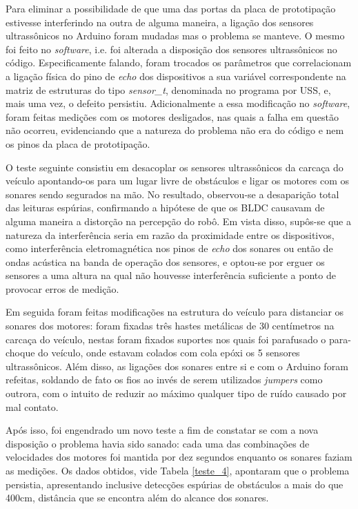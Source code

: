 Para eliminar a possibilidade de que uma das portas da placa de prototipação estivesse interferindo na outra de alguma maneira, a 
ligação dos sensores ultrassônicos no Arduino foram mudadas mas o problema se manteve.
O mesmo foi feito no \textit{software}, i.e. foi alterada a disposição dos sensores ultrassônicos no código. 
Especificamente falando, foram trocados os parâmetros que correlacionam a ligação física do pino de \textit{echo} dos dispositivos a sua variável 
correspondente na matriz de estruturas do tipo \textit{sensor\_t}, denominada no programa por USS, e, mais uma vez, o defeito persistiu.
Adicionalmente a essa modificação no \textit{software}, foram feitas medições com os motores desligados, nas quais a falha em questão não ocorreu, 
evidenciando que a natureza do problema não era do código e nem os pinos da placa de prototipação.

O teste seguinte consistiu em desacoplar os sensores ultrassônicos da carcaça do veículo apontando-os para um lugar livre de obstáculos e ligar os 
motores com os sonares sendo segurados na mão. 
No resultado, observou-se a desaparição total das leituras espúrias, confirmando a hipótese de que os BLDC causavam de alguma maneira a distorção na 
percepção do robô.
Em vista disso, supôs-se que a natureza da interferência seria em razão da proximidade entre os dispositivos, como interferência eletromagnética nos 
pinos de \textit{echo} dos sonares ou então de ondas acústica na banda de operação dos sensores, e optou-se por erguer os sensores a uma altura 
na qual não houvesse interferência suficiente a ponto de provocar erros de medição.

Em seguida foram feitas modificações na estrutura do veículo para distanciar os sonares dos motores: foram fixadas três hastes metálicas de 30 
centímetros na carcaça do veículo, nestas foram fixados suportes nos quais foi parafusado o para-choque do veículo, onde estavam colados com 
cola epóxi os 5 sensores ultrassônicos. Além disso, as ligações dos sonares entre si e com o Arduino foram refeitas, soldando de fato os fios ao 
invés de serem utilizados \textit{jumpers} como outrora, com o intuito de reduzir ao máximo qualquer tipo de ruído causado por mal contato.

Após isso, foi engendrado um novo teste a fim de constatar se com a nova disposição o problema havia sido sanado: cada uma das combinações de 
velocidades dos motores foi mantida por dez segundos enquanto os sonares faziam as medições.
Os dados obtidos, vide Tabela \ref{teste_4}, apontaram que o problema persistia, apresentando inclusive detecções espúrias de obstáculos a mais 
do que 400cm, distância que se encontra além do alcance dos sonares.

